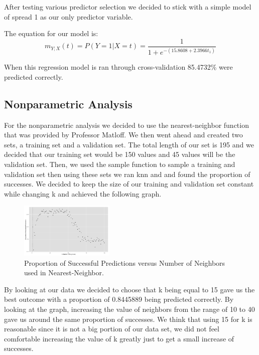 \documentclass{article}
\begin{document}
After testing various predictor selection we decided to stick with a
simple model of spread 1 as our only predictor variable.

The equation for our model is:
\begin{equation}
\label{logit2}
m_{Y;X}(t) = P(Y = 1 | X = t) = \frac{1}{1+e^{-(15.8608+2.3966
t_1)}}
\end{equation}

When this regression model is ran through cross-validation 85.4732\%
were predicted correctly.  

\subsection{Nonparametric Analysis}

For the nonparametric analysis we decided to use the nearest-neighbor function
that was provided by Professor Matloff. We then went ahead and created two
sets, a training set and a validation set. The total length of our set is 195
and we decided that our training set would be 150 values and 45 values will be
the validation set. Then, we used the sample function to sample a training and
validation set then using these sets we ran knn and and found the proportion of
successes. We decided to keep the size of our training and validation set
constant while changing k and achieved the following graph.

\begin{figure}
  \centering
  \includegraphics[width=0.4\textwidth]{knn_prop_pred.jpg}
  \caption{Proportion of Successful Predictions versus Number of Neighbors used in Nearest-Neighbor.}
\end{figure}

By looking at our data we decided to choose that k being equal to 15 gave us
the best outcome with a proportion of 0.8445889 being predicted correctly. By
looking at the graph, increasing the value of neighbors from the range of 10 to
40 gave us around the same proportion of successes. We think that using 15 for
k is reasonable since it is not a big portion of our data set, we did not feel
comfortable increasing the value of k greatly just to get a small increase of
successes.
\end{document}
